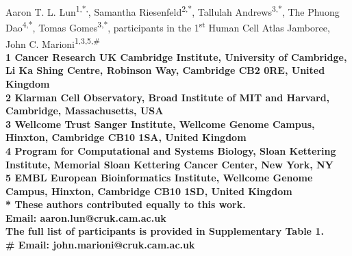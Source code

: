 \documentclass[10pt,letterpaper]{article}
\begin{document}
\vspace*{0.35in}

\begin{flushleft}
{\Large
    \textbf{}
}
\newline

Aaron T. L. Lun\textsuperscript{1,*,\dag{}},
Samantha Riesenfeld\textsuperscript{2,*},
Tallulah Andrews\textsuperscript{3,*},
The Phuong Dao\textsuperscript{4,*},
Tomas Gomes\textsuperscript{3,*},
participants in the 1\textsuperscript{st} Human Cell Atlas Jamboree\textsuperscript{\ddag{}},
John C. Marioni\textsuperscript{1,3,5,\#}
\\
\bigskip
\bf{1} Cancer Research UK Cambridge Institute, University of Cambridge, Li Ka Shing Centre, Robinson Way, Cambridge CB2 0RE, United Kingdom \\
\bf{2} Klarman Cell Observatory, Broad Institute of MIT and Harvard, Cambridge, Massachusetts, USA \\
\bf{3} Wellcome Trust Sanger Institute, Wellcome Genome Campus, Hinxton, Cambridge CB10 1SA, United Kingdom \\
\bf{4} Program for Computational and Systems Biology, Sloan Kettering Institute, Memorial Sloan Kettering Cancer Center, New York, NY \\
\bf{5} EMBL European Bioinformatics Institute, Wellcome Genome Campus, Hinxton, Cambridge CB10 1SD, United Kingdom
\\
\bigskip
* These authors contributed equally to this work.\\
\dag{} Email: aaron.lun@cruk.cam.ac.uk \\
\ddag{} The full list of participants is provided in Supplementary Table 1. \\
\# Email: john.marioni@cruk.cam.ac.uk

\end{flushleft}
\end{document}
